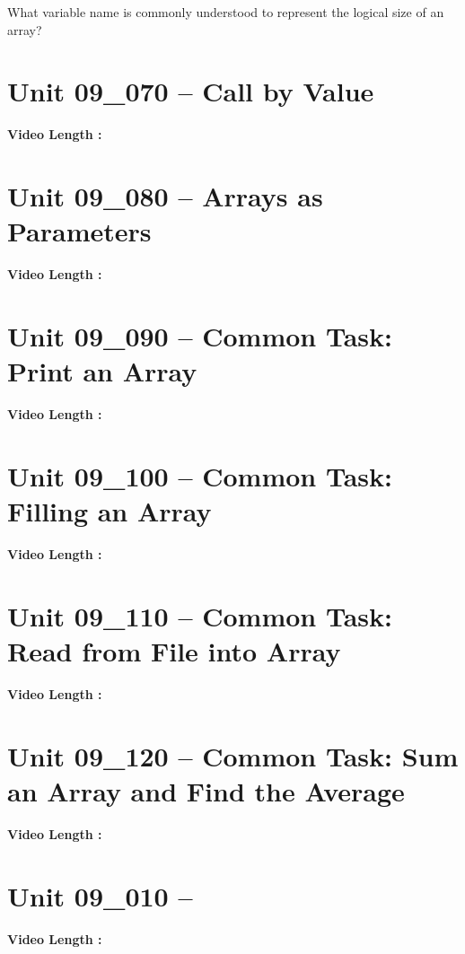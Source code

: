 \documentclass[letterpaper,12pt]{exam}
\newcommand{\unit}{Unit 09}
\begin{document}
\begin{questions}
\begin{samepage}
    \question What variable name is commonly understood to represent the logical size of an array?
    \vspace{5mm}
\end{samepage}

\section*{\unit\_070 -- Call by Value } 
\par{\selectfont\textbf{Video Length :}}

\section*{\unit\_080 -- Arrays as Parameters} 
\par{\selectfont\textbf{Video Length :}}

\section*{\unit\_090 -- Common Task: Print an Array} 
\par{\selectfont\textbf{Video Length :}}

\section*{\unit\_100 -- Common Task: Filling an Array} 
\par{\selectfont\textbf{Video Length :}}
\section*{\unit\_110 -- Common Task: Read from File into Array} 
\par{\selectfont\textbf{Video Length :}}
\section*{\unit\_120 -- Common Task: Sum an Array and Find the Average} 
\par{\selectfont\textbf{Video Length :}}
\section*{\unit\_010 -- } 
\par{\selectfont\textbf{Video Length :}}





\end{questions}
\end{document}
